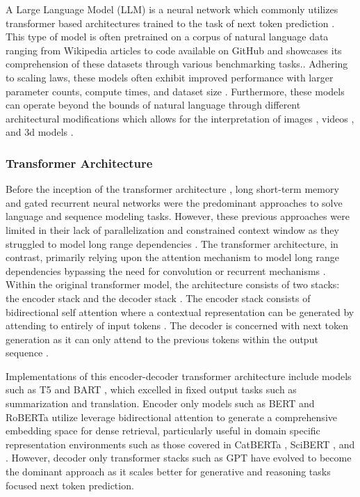 A Large Language Model (LLM) is a neural network which commonly utilizes
transformer based architectures trained to the task of next token prediction
\cite{vaswani_attention_2023, devlin_bert_2019}. This type of model is often
pretrained on a corpus of natural language data ranging from Wikipedia articles
to code available on GitHub and showcases its comprehension of these datasets
through various benchmarking tasks.\cite{gururangan_dont_2020,
hendrycks_measuring_2020, cobbe_training_2021}. Adhering to scaling laws, these
models often exhibit improved performance with larger parameter counts, compute
times, and dataset size \cite{brown_language_2020}. Furthermore, these models
can operate beyond the bounds of natural language through different
architectural modifications which allows for the interpretation of images
\cite{dosovitskiy_image_2020}, videos \cite{arnab_vivit_2021}, and 3d models
\cite{yu_point-bert_2022}.

\subsubsection{Transformer Architecture}
\label{sec:transformers}
Before the inception of the transformer architecture
\cite{vaswani_attention_2023}, long short-term memory
\cite{hochreiter_long_1997} and gated recurrent neural networks
\cite{chung_empirical_2014} were the predominant approaches to solve language
and sequence modeling tasks. However, these previous approaches were limited in
their lack of parallelization and constrained context window as they struggled
to model long range dependencies \cite{hochreiter_long_1997,
chung_empirical_2014, vaswani_attention_2023}. The transformer architecture, in
contrast, primarily relying upon the attention mechanism to model long range
dependencies bypassing the need for convolution or recurrent mechanisms
\cite{vaswani_attention_2023}. Within the original transformer model, the
architecture consists of two stacks: the encoder stack and the decoder stack
\cite{vaswani_attention_2023}. The encoder stack consists of bidirectional self
attention where a contextual representation can be generated by attending to
entirely of input tokens \cite{vaswani_attention_2023}. The decoder is concerned
with next token generation as it can only attend to the previous tokens within
the output sequence \cite{vaswani_attention_2023}.

Implementations of this encoder-decoder transformer architecture include models
such as T5 \cite{raffel_exploring_2023} and BART \cite{lewis_bart_2019}, which
excelled in fixed output tasks such as summarization and translation. Encoder
only models such as BERT \cite{devlin_bert_2019} and RoBERTa
\cite{liu_roberta_2019} utilize leverage bidirectional attention to generate a
comprehensive embedding space for dense retrieval, particularly useful in domain
specific representation environments such as those covered in CatBERTa
\cite{ock_catalyst_2023}, SciBERT \cite{beltagy_scibert_2019}, and
\cite{yu_point-bert_2022}. However, decoder only transformer stacks such as GPT
\cite{radford_improving_2018} have evolved to become the dominant approach as it
scales better for generative and reasoning tasks focused next token prediction.

